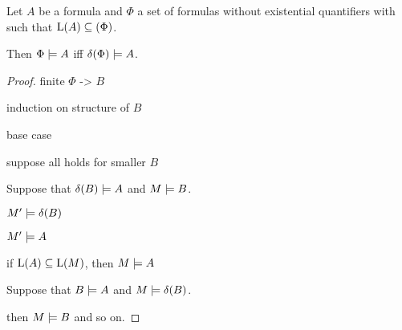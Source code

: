 \begin{lemma}
	Let $A$ be a formula and $\Phi$ a set of formulas without existential quantifiers with such that $\operatorname{L}(A) \subseteq(\Phi)$.

	Then $\Phi \models A$ iff $\delta(\Phi) \models A$.

\end{lemma}
\begin{proof}
	finite $\Phi$ -> $B$

	induction on structure of $B$

	base case

	suppose all holds for smaller $B$

	Suppose that $\delta(B) \models A$ and $M \models B$.

	$M' \models \delta(B)$

	$M' \models A$

	if $\operatorname{L}(A) \subseteq \operatorname{L}(M)$, then $M\models A$
	\bigskip

	Suppose that $B \models A$ and $M \models \delta(B)$.

	then $M \models B$ and so on.


\end{proof}


